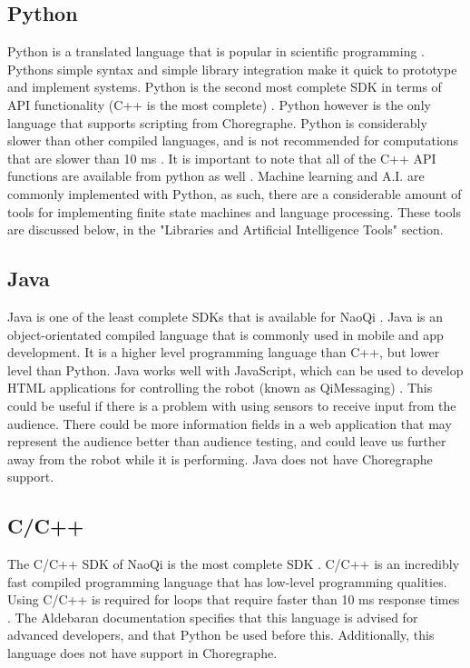 \documentclass[onecolumn, draftclsnofoot,10pt, compsoc]{IEEEtran}
\begin{document}
  \subsection{Python}
  Python is a translated language that is popular in scientific programming \cite{Python.org}. Pythons simple syntax and simple library integration make it quick to prototype and implement systems. Python is the second most complete SDK in terms of API functionality (C++ is the most complete) \cite{languageBenefits}. Python however is the only language that supports scripting from Choregraphe. Python is considerably slower than other compiled languages, and is not recommended for computations that are slower than 10 ms \cite{programmingLanguages}. It is important to note that all of the C++ API functions are available from python as well \cite{pythonSDK}. Machine learning and A.I. are commonly implemented with Python, as such, there are a considerable amount of tools for implementing finite state machines and language processing. These tools are discussed below, in the "Libraries and Artificial Intelligence Tools" section.
  \subsection{Java}

  Java is one of the least complete SDKs that is available for NaoQi \cite{programmingLanguages}. Java is an object-orientated compiled language that is commonly used in mobile and app development. It is a higher level programming language than C++, but lower level than Python. Java works well with JavaScript, which can be used to develop HTML applications for controlling the robot (known as QiMessaging) \cite{qimessagingjavascript}. This could be useful if there is a problem with using sensors to receive input from the audience. There could be more information fields in a web application that may represent the audience better than audience testing, and could leave us further away from the robot while it is performing. Java does not have Choregraphe support.
  \subsection{C/C++}

  The C/C++ SDK of NaoQi is the most complete SDK \cite{programmingLanguages}. C/C++ is an incredibly fast compiled programming language that has low-level programming qualities. Using C/C++ is required for loops that require faster than 10 ms response times \cite{programmingLanguages}. The Aldebaran documentation specifies that this language is advised for advanced developers, and that Python be used before this. Additionally, this language does not have support in Choregraphe. 
\end{document}
